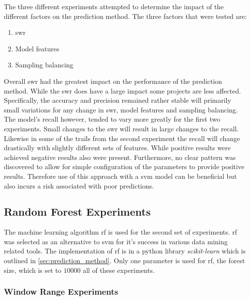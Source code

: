 The three different experiments attempted to determine the impact of the different factors on the prediction method. The three factors that were tested are:
\begin{enumerate}
\item \gls{swr}
\item Model features
\item Sampling balancing
\end{enumerate}
Overall \gls{swr} had the greatest impact on the performance of the prediction method. While the \gls{swr} does have a large impact some projects are less affected. Specifically, the accuracy and precision remained rather stable will primarily small variations for any change in \gls{swr}, model features and sampling balancing. The model's recall however, tended to vary more greatly for the first two experiments. Small changes to the \gls{swr} will result in large changes to the recall. Likewise in some of the trails from the second experiment the recall will change drastically with slightly different sets of features. While positive results were achieved negative results also were present. Furthermore, no clear pattern was discovered to allow for simple configuration of the parameters to provide positive results. Therefore use of this approach with a \gls{svm} model can be beneficial but also incurs a risk associated with poor predictions.   

\subsection{Random Forest Experiments}
\label{sec:rf_experiments}

The machine learning algorithm \gls{rf} is used for the second set of experiments. \gls{rf} was selected as an alternative to \gls{svm} for it's success in various data mining related tools. The implementation of \gls{rf} is in a python library \textit{scikit-learn} which is outlined in \autoref{sec:prediction_method}. Only one parameter is used for \gls{rf}, the forest size, which is set to $10000$ all of these experiments.

\subsubsection{Window Range Experiments}
\label{sec:rf_swr_experiment}

